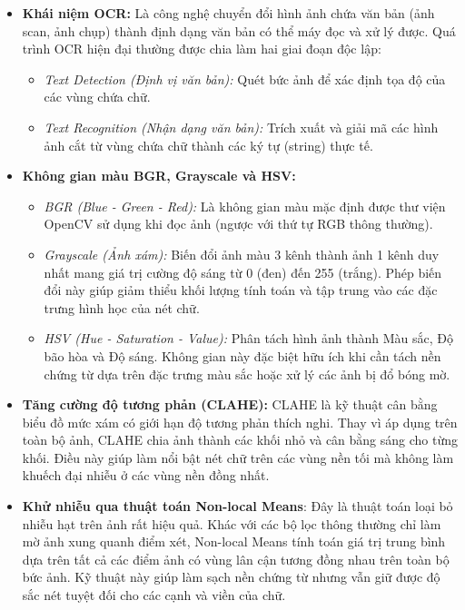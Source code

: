 \begin{itemize}
    \item \textbf{Khái niệm OCR:} 
    Là công nghệ chuyển đổi hình ảnh chứa văn bản (ảnh scan, ảnh chụp) thành định dạng văn bản có thể máy đọc và xử lý được. Quá trình OCR hiện đại thường được chia làm hai giai đoạn độc lập:
    \begin{itemize}
        \item \textit{Text Detection (Định vị văn bản):} Quét bức ảnh để xác định tọa độ của các vùng chứa chữ.
        \item \textit{Text Recognition (Nhận dạng văn bản):} Trích xuất và giải mã các hình ảnh cắt từ vùng chứa chữ thành các ký tự (string) thực tế.
    \end{itemize}

    \item \textbf{Không gian màu BGR, Grayscale và HSV:}
    \begin{itemize}
        \item \textit{BGR (Blue - Green - Red):} Là không gian màu mặc định được thư viện OpenCV sử dụng khi đọc ảnh (ngược với thứ tự RGB thông thường).
        \item \textit{Grayscale (Ảnh xám):} Biến đổi ảnh màu 3 kênh thành ảnh 1 kênh duy nhất mang giá trị cường độ sáng từ 0 (đen) đến 255 (trắng). Phép biến đổi này giúp giảm thiểu khối lượng tính toán và tập trung vào các đặc trưng hình học của nét chữ.
        \item \textit{HSV (Hue - Saturation - Value):} Phân tách hình ảnh thành Màu sắc, Độ bão hòa và Độ sáng. Không gian này đặc biệt hữu ích khi cần tách nền chứng từ dựa trên đặc trưng màu sắc hoặc xử lý các ảnh bị đổ bóng mờ.
    \end{itemize}

    \item \textbf{Tăng cường độ tương phản (CLAHE):}
    CLAHE là kỹ thuật cân bằng biểu đồ mức xám có giới hạn độ tương phản thích nghi. Thay vì áp dụng trên toàn bộ ảnh, CLAHE chia ảnh thành các khối nhỏ và cân bằng sáng cho từng khối. Điều này giúp làm nổi bật nét chữ trên các vùng nền tối mà không làm khuếch đại nhiễu ở các vùng nền đồng nhất.

    \item \textbf{Khử nhiễu qua thuật toán Non-local Means}: 
    Đây là thuật toán loại bỏ nhiễu hạt trên ảnh rất hiệu quả. Khác với các bộ lọc thông thường chỉ làm mờ ảnh xung quanh điểm xét, Non-local Means tính toán giá trị trung bình dựa trên tất cả các điểm ảnh có vùng lân cận tương đồng nhau trên toàn bộ bức ảnh. Kỹ thuật này giúp làm sạch nền chứng từ nhưng vẫn giữ được độ sắc nét tuyệt đối cho các cạnh và viền của chữ.


\end{itemize}
